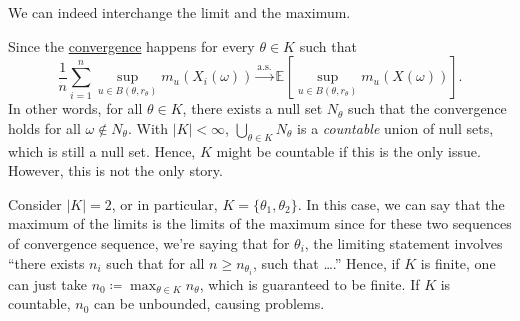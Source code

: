 \begin{claim}
	We can indeed interchange the limit and the maximum.
\end{claim}
\begin{explanation}
	Since the \hyperref[def:converge-almost-surely]{convergence} happens for every \(\theta \in K\) such that
	\[
		\frac{1}{n} \sum_{i=1}^{n} \sup _{u \in B(\theta , r_\theta )} m_u(X_i(\omega ))
		\overset{\text{a.s.} }{\to} \mathbb{E}_{}\left[ \sup _{u \in B(\theta , r_\theta )} m_u(X(\omega )) \right].
	\]
	In other words, for all \(\theta \in K\), there exists a null set \(N_\theta \) such that the convergence holds for all \(\omega \notin N_\theta \). With \(\lvert K \rvert < \infty \), \(\bigcup_{\theta \in K} N_\theta \) is a \emph{countable} union of null sets, which is still a null set. Hence, \(K\) might be countable if this is the only issue. However, this is not the only story.

	Consider \(\lvert K \rvert = 2\), or in particular, \(K = \{ \theta _1, \theta _2 \} \). In this case, we can say that the maximum of the limits is the limits of the maximum since for these two sequences of convergence sequence, we're saying that for \(\theta _i\), the limiting statement involves ``there exists \(n_i\) such that for all \(n \geq n_{\theta _i}\), such that \dots.'' Hence, if \(K\) is finite, one can just take \(n_0 \coloneqq \max _{\theta \in K} n_{\theta }\), which is guaranteed to be finite. If \(K\) is countable, \(n_0\) can be unbounded, causing problems.
\end{explanation}

